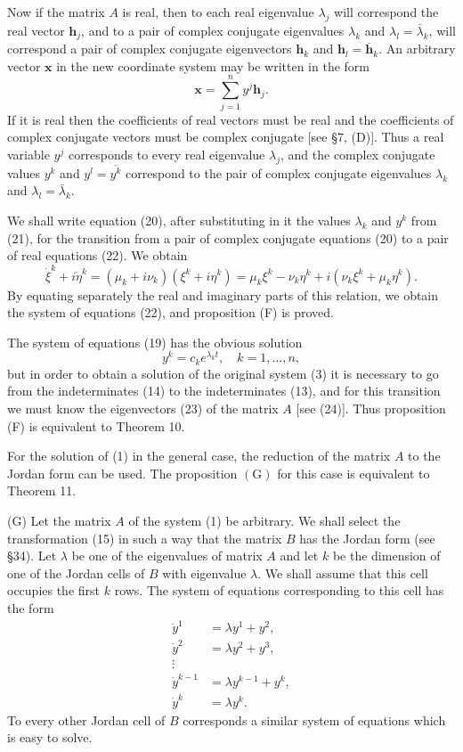 \documentclass[10pt,a5paper]{book}
\theoremstyle{plain}
\theoremstyle{definition}
\theoremstyle{remark}
\begin{document}
Now if the matrix $A$ is real, then to each real eigenvalue $\lambda_{j}$ will correspond the real vector $\mathbf{h}_{j}$, and to a pair of complex conjugate eigenvalues $\lambda_{k}$ and $\lambda_{l}=\bar{\lambda}_{k}$, will correspond a pair of complex conjugate eigenvectors $\mathbf{h}_{k}$ and $\mathbf{h}_{l}=\overline{\mathbf{h}}_{k}$. An arbitrary vector $\mathbf{x}$ in the new coordinate system may be written in the form
\begin{equation*}
\mathbf{x}=\sum_{j=1}^{n} y^{j} \mathbf{h}_{j} . \tag{24}
\end{equation*}
If it is real then the coefficients of real vectors must be real and the coefficients of complex conjugate vectors must be complex conjugate [see §7, (D)]. Thus a real variable $y^{j}$ corresponds to every real eigenvalue $\lambda_{j}$, and the complex conjugate values $y^{k}$ and $y^{l}=\overline{y^{k}}$ correspond to the pair of complex conjugate eigenvalues $\lambda_{k}$ and $\lambda_{l}=\bar{\lambda}_{k}$.

We shall write equation (20), after substituting in it the values $\lambda_{k}$ and $y^{k}$ from (21), for the transition from a pair of complex conjugate equations (20) to a pair of real equations (22). We obtain
\[
\dot{\xi}^{k}+i \dot{\eta}^{k}=\left(\mu_{k}+i \nu_{k}\right)\left(\xi^{k}+i \eta^{k}\right)=\mu_{k} \xi^{k}-\nu_{k} \eta^{k}+i\left(\nu_{k} \xi^{k}+\mu_{k} \eta^{k}\right) .
\]
By equating separately the real and imaginary parts of this relation, we obtain the system of equations (22), and proposition (F) is proved.

The system of equations (19) has the obvious solution
\[
y^{k}=c_{k} e^{\lambda_{k} t}, \quad k=1, \ldots, n,
\]
but in order to obtain a solution of the original system (3) it is necessary to go from the indeterminates (14) to the indeterminates (13), and for this transition we must know the eigenvectors (23) of the matrix $A$ [see (24)]. Thus proposition (F) is equivalent to Theorem 10.

For the solution of (1) in the general case, the reduction of the matrix $A$ to the Jordan form can be used. The proposition $(\mathrm{G})$ for this case is equivalent to Theorem 11.

(G) Let the matrix $A$ of the system (1) be arbitrary. We shall select the transformation (15) in such a way that the matrix $B$ has the Jordan form (see §34). Let $\lambda$ be one of the eigenvalues of matrix $A$ and let $k$ be the dimension of one of the Jordan cells of $B$ with eigenvalue $\lambda$. We shall assume that this cell occupies the first $k$ rows. The system of equations corresponding to this cell has the form
\[
\begin{aligned}
\dot{y}^{1} & =\lambda y^{1}+y^{2}, \\
\dot{y}^{2} & =\lambda y^{2}+y^{3}, \\
\vdots & \\
\dot{y}^{k-1} & =\lambda y^{k-1}+y^{k}, \\
\dot{y}^{k} & =\lambda y^{k} .
\end{aligned}
\]
To every other Jordan cell of $B$ corresponds a similar system of equations which is easy to solve.
\end{document}
